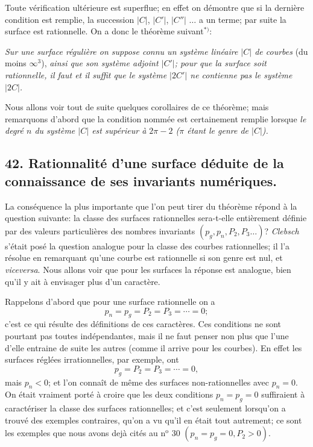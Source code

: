 \documentclass{article}
\begin{document}
Toute vérification ultérieure est superflue; en effet on démontre que si la dernière condition est remplie, la succession $|C|$, $|C'|$, $|C''|$ $\ldots$ a un terme; par suite la surface est rationnelle. On a donc le théorème suivant${}^{*)}$:

\emph{Sur une surface régulière on suppose connu un système linéaire $|C|$ de courbes} (du moins $\infty^{3}$), \emph{ainsi que son système adjoint $|C'|$; pour que la surface soit rationnelle, il faut et il suffit que le système $|2C'|$ ne contienne pas le système $|2C|$.}

Nous allons voir tout de suite quelques corollaires de ce théorème; mais remarquons d'abord que la condition nommée est certainement remplie lorsque \emph{le degré $n$ du système $|C|$ est supérieur à $2\pi - 2$ ($\pi$ étant le genre de $|C|$).}

\subsection*{42. Rationnalité d'une surface déduite de la connaissance de ses invariants numériques.}

La conséquence la plus importante que l'on peut tirer du théorème répond à la question suivante: la classe des surfaces rationnelles sera-t-elle entièrement définie par des valeurs particulières des nombres invariants $(p_{g}, p_{n}, P_{2}, P_{3} \ldots)$? \emph{Clebsch} s'était posé la question analogue pour la classe des courbes rationnelles; il l'a résolue en remarquant qu'une courbe est rationnelle si son genre est nul, et \emph{viceversa}. Nous allons voir que pour les surfaces la réponse est analogue, bien qu'il y ait à envisager plus d'un caractère.

Rappelons d'abord que pour une surface rationnelle on a
\[ p_{n} = p_{g} = P_{2} = P_{3} = \cdots = 0; \]
c'est ce qui résulte des définitions de ces caractères. Ces conditions ne sont pourtant pas toutes indépendantes, mais il ne faut penser non plus que l'une d'elle entraine de suite les autres (comme il arrive pour les courbes). En effet les surfaces réglées irrationnelles, par exemple, ont
\[ p_{g} = P_{2} = P_{3} = \cdots = 0, \]
mais $p_{n} < 0$; et l'on connaît de même des surfaces non-rationnelles avec $p_{n} = 0$. On était vraiment porté à croire que les deux conditions $p_{n} = p_{g} = 0$ suffiraient à caractériser la classe des surfaces rationnelles; et c'est seulement lorsqu'on a trouvé des exemples contraires, qu'on a vu qu'il en était tout autrement; ce sont les exemples que nous avons dejà cités au n${}^{\text{o}}$ 30 $(p_{n} = p_{g} = 0, P_{2} > 0)$.
\end{document}
